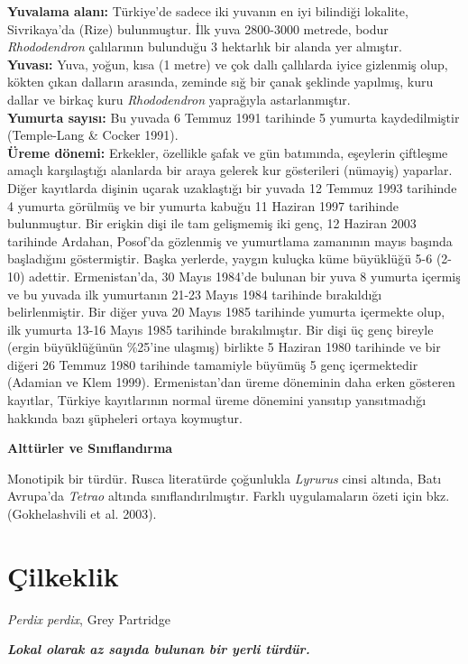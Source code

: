 \documentclass[
  letterpaper,
  DIV=11,
  numbers=noendperiod]{scrreprt}
\begin{document}
\textbf{Yuvalama alanı:} Türkiye'de sadece iki yuvanın en iyi bilindiği
lokalite, Sivrikaya'da (Rize) bulunmuştur. İlk yuva 2800-3000 metrede,
bodur \emph{Rhododendron} çalılarının bulunduğu 3 hektarlık bir alanda
yer almıştır.\\
\textbf{Yuvası:} Yuva, yoğun, kısa (1 metre) ve çok dallı çallılarda
iyice gizlenmiş olup, kökten çıkan dalların arasında, zeminde sığ bir
çanak şeklinde yapılmış, kuru dallar ve birkaç kuru \emph{Rhododendron}
yaprağıyla astarlanmıştır.\\
\textbf{Yumurta sayısı:} Bu yuvada 6 Temmuz 1991 tarihinde 5 yumurta
kaydedilmiştir (Temple-Lang \& Cocker 1991).\\
\textbf{Üreme dönemi:} Erkekler, özellikle şafak ve gün batımında,
eşeylerin çiftleşme amaçlı karşılaştığı alanlarda bir araya gelerek kur
gösterileri (nümayiş) yaparlar. Diğer kayıtlarda dişinin uçarak
uzaklaştığı bir yuvada 12 Temmuz 1993 tarihinde 4 yumurta görülmüş ve
bir yumurta kabuğu 11 Haziran 1997 tarihinde bulunmuştur. Bir erişkin
dişi ile tam gelişmemiş iki genç, 12 Haziran 2003 tarihinde Ardahan,
Posof'da gözlenmiş ve yumurtlama zamanının mayıs başında başladığını
göstermiştir. Başka yerlerde, yaygın kuluçka küme büyüklüğü 5-6 (2-10)
adettir. Ermenistan'da, 30 Mayıs 1984'de bulunan bir yuva 8 yumurta
içermiş ve bu yuvada ilk yumurtanın 21-23 Mayıs 1984 tarihinde
bırakıldığı belirlenmiştir. Bir diğer yuva 20 Mayıs 1985 tarihinde
yumurta içermekte olup, ilk yumurta 13-16 Mayıs 1985 tarihinde
bırakılmıştır. Bir dişi üç genç bireyle (ergin büyüklüğünün \%25'ine
ulaşmış) birlikte 5 Haziran 1980 tarihinde ve bir diğeri 26 Temmuz 1980
tarihinde tamamiyle büyümüş 5 genç içermektedir (Adamian ve Klem 1999).
Ermenistan'dan üreme döneminin daha erken gösteren kayıtlar, Türkiye
kayıtlarının normal üreme dönemini yansıtıp yansıtmadığı hakkında bazı
şüpheleri ortaya koymuştur.

\textbf{Alttürler ve Sınıflandırma}

Monotipik bir türdür. Rusca literatürde çoğunlukla \emph{Lyrurus} cinsi
altında, Batı Avrupa'da \emph{Tetrao} altında sınıflandırılmıştır.
Farklı uygulamaların özeti için bkz. (Gokhelashvili et al. 2003).

\section{Çilkeklik}\label{uxe7ilkeklik}

\emph{Perdix perdix}, Grey Partridge

\textbf{\emph{Lokal olarak az sayıda bulunan bir yerli türdür.}}
\end{document}
